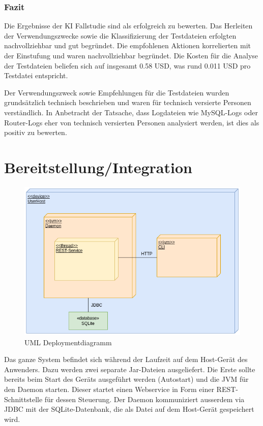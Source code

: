 \documentclass[a4paper,12pt]{report}
\begin{document}
    \subsection{Fazit}\label{subsec:diskussion}
    Die Ergebnisse der KI Fallstudie sind als erfolgreich zu bewerten.
    Das Herleiten der Verwendungszwecke sowie die Klassifizierung der Testdateien erfolgten nachvollziehbar und gut begründet.
    Die empfohlenen Aktionen korrelierten mit der Einstufung und waren nachvollziehbar begründet.
    Die Kosten für die Analyse der Testdateien beliefen sich auf insgesamt 0.58 USD, was rund 0.011 USD pro Testdatei entspricht.

    Der Verwendungszweck sowie Empfehlungen für die Testdateien wurden grundsätzlich technisch beschrieben und waren für technisch versierte Personen verständlich.
    In Anbetracht der Tatsache, dass Logdateien wie MySQL-Logs oder Router-Logs eher von technisch versierten Personen analysiert werden, ist dies als positiv zu bewerten.

    \clearpage


    \chapter{Bereitstellung/Integration}\label{ch:bereitstellung-integration}

    \begin{figure}[h]
        \centering
        \includegraphics[width=1\textwidth]{assets/DeplDiagram}
        \caption{UML Deploymentdiagramm}
        \label{fig:depl-diag}
    \end{figure}

    Das ganze System befindet sich während der Laufzeit auf dem Host-Gerät des Anwenders.
    Dazu werden zwei separate Jar-Dateien ausgeliefert.
    Die Erste sollte bereits beim Start des Geräts ausgeführt werden (Autostart) und die JVM für den Daemon starten.
    Dieser startet einen Webservice in Form einer REST-Schnittstelle für dessen Steuerung.
    Der Daemon kommuniziert ausserdem via JDBC mit der SQLite-Datenbank, die als Datei auf dem Host-Gerät gespeichert wird.
\end{document}
